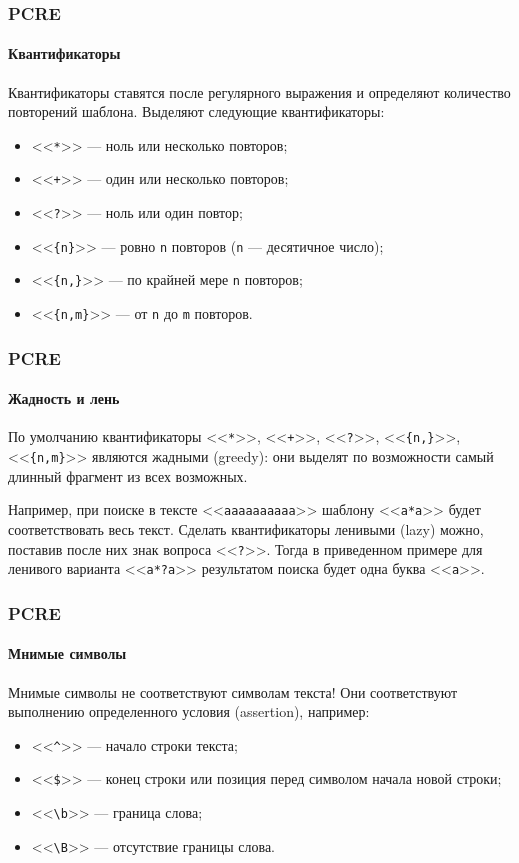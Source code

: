 \begin{frame}[fragile]
    \frametitle{PCRE}
    \framesubtitle{Квантификаторы}
    
    \alert{Квантификаторы} ставятся после регулярного выражения и определяют количество повторений шаблона. Выделяют следующие квантификаторы:
    \begin{itemize}
        \item{} <<\verb"*">> --- ноль или несколько повторов;
        \item{} <<\verb"+">> --- один или несколько повторов;
        \item{} <<\verb"?">> --- ноль или один повтор;
        \item{} <<\verb"{n}">> --- ровно \verb"n" повторов (\verb"n" --- десятичное число);
        \item{} <<\verb"{n,}">> --- по крайней мере \verb"n" повторов;
        \item{} <<\verb"{n,m}">> --- от \verb"n" до \verb"m" повторов.
    \end{itemize}
\end{frame}

\begin{frame}[fragile]
    \frametitle{PCRE}
    \framesubtitle{Жадность и лень}
    
    По умолчанию квантификаторы <<\verb"*">>, <<\verb"+">>, <<\verb"?">>, <<\verb"{n,}">>, <<\verb"{n,m}">> являются \alert{жадными} (greedy): они выделят по возможности самый длинный фрагмент из всех возможных. 
    
    Например, при поиске в тексте <<\verb"aaaaaaaaaa">> шаблону <<\verb"a*a">> будет соответствовать весь текст. Сделать квантификаторы \alert{ленивыми} (lazy) можно, поставив после них знак вопроса <<\verb"?">>. Тогда в приведенном примере для ленивого варианта <<\verb"a*?a">> результатом поиска будет одна буква <<\verb"a">>.    
\end{frame}


\begin{frame}[fragile]
    \frametitle{PCRE}
    \framesubtitle{Мнимые символы}
    
    \alert{Мнимые символы} не соответствуют символам текста! Они соответствуют выполнению определенного условия (assertion), например:
    \begin{itemize}
        \item{} <<\verb"^">> --- начало строки текста;
        \item{} <<\verb"$">> --- конец строки или позиция перед символом начала новой строки;
        \item{} <<\verb"\b">> --- граница слова;
        \item{} <<\verb"\B">> --- отсутствие границы слова.
    \end{itemize}
\end{frame}


